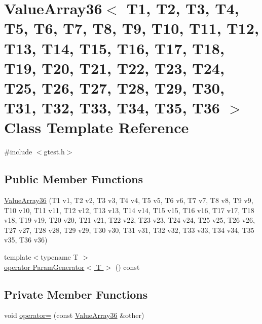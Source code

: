\hypertarget{classtesting_1_1internal_1_1ValueArray36}{\section{\-Value\-Array36$<$ \-T1, \-T2, \-T3, \-T4, \-T5, \-T6, \-T7, \-T8, \-T9, \-T10, \-T11, \-T12, \-T13, \-T14, \-T15, \-T16, \-T17, \-T18, \-T19, \-T20, \-T21, \-T22, \-T23, \-T24, \-T25, \-T26, \-T27, \-T28, \-T29, \-T30, \-T31, \-T32, \-T33, \-T34, \-T35, \-T36 $>$ \-Class \-Template \-Reference}
\label{d9/d8e/classtesting_1_1internal_1_1ValueArray36}
}


{\ttfamily \#include $<$gtest.\-h$>$}

\subsection*{\-Public \-Member \-Functions}
\begin{DoxyCompactItemize}
\item 
\hyperlink{classtesting_1_1internal_1_1ValueArray36_aeca58d78c397ff57c23eb629496d781e}{\-Value\-Array36} (\-T1 v1, \-T2 v2, \-T3 v3, \-T4 v4, \-T5 v5, \-T6 v6, \-T7 v7, \-T8 v8, \-T9 v9, \-T10 v10, \-T11 v11, \-T12 v12, \-T13 v13, \-T14 v14, \-T15 v15, \-T16 v16, \-T17 v17, \-T18 v18, \-T19 v19, \-T20 v20, \-T21 v21, \-T22 v22, \-T23 v23, \-T24 v24, \-T25 v25, \-T26 v26, \-T27 v27, \-T28 v28, \-T29 v29, \-T30 v30, \-T31 v31, \-T32 v32, \-T33 v33, \-T34 v34, \-T35 v35, \-T36 v36)
\item 
{\footnotesize template$<$typename T $>$ }\\\hyperlink{classtesting_1_1internal_1_1ValueArray36_a08ef46fa12c9dd8ef6fc630baeea89b7}{operator Param\-Generator$<$ T $>$} () const 
\end{DoxyCompactItemize}
\subsection*{\-Private \-Member \-Functions}
\begin{DoxyCompactItemize}
\item 
void \hyperlink{classtesting_1_1internal_1_1ValueArray36_a149efb901f959469a23a20f3d563b8ff}{operator=} (const \hyperlink{classtesting_1_1internal_1_1ValueArray36}{\-Value\-Array36} \&other)
\end{DoxyCompactItemize}
